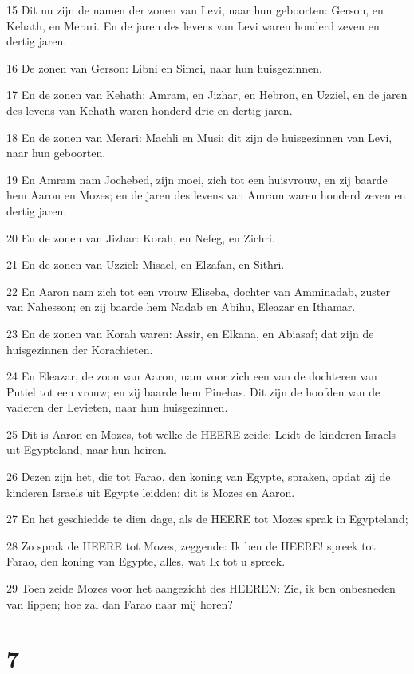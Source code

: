 \par 15 Dit nu zijn de namen der zonen van Levi, naar hun geboorten: Gerson, en Kehath, en Merari. En de jaren des levens van Levi waren honderd zeven en dertig jaren.
\par 16 De zonen van Gerson: Libni en Simei, naar hun huisgezinnen.
\par 17 En de zonen van Kehath: Amram, en Jizhar, en Hebron, en Uzziel, en de jaren des levens van Kehath waren honderd drie en dertig jaren.
\par 18 En de zonen van Merari: Machli en Musi; dit zijn de huisgezinnen van Levi, naar hun geboorten.
\par 19 En Amram nam Jochebed, zijn moei, zich tot een huisvrouw, en zij baarde hem Aaron en Mozes; en de jaren des levens van Amram waren honderd zeven en dertig jaren.
\par 20 En de zonen van Jizhar: Korah, en Nefeg, en Zichri.
\par 21 En de zonen van Uzziel: Misael, en Elzafan, en Sithri.
\par 22 En Aaron nam zich tot een vrouw Eliseba, dochter van Amminadab, zuster van Nahesson; en zij baarde hem Nadab en Abihu, Eleazar en Ithamar.
\par 23 En de zonen van Korah waren: Assir, en Elkana, en Abiasaf; dat zijn de huisgezinnen der Korachieten.
\par 24 En Eleazar, de zoon van Aaron, nam voor zich een van de dochteren van Putiel tot een vrouw; en zij baarde hem Pinehas. Dit zijn de hoofden van de vaderen der Levieten, naar hun huisgezinnen.
\par 25 Dit is Aaron en Mozes, tot welke de HEERE zeide: Leidt de kinderen Israels uit Egypteland, naar hun heiren.
\par 26 Dezen zijn het, die tot Farao, den koning van Egypte, spraken, opdat zij de kinderen Israels uit Egypte leidden; dit is Mozes en Aaron.
\par 27 En het geschiedde te dien dage, als de HEERE tot Mozes sprak in Egypteland;
\par 28 Zo sprak de HEERE tot Mozes, zeggende: Ik ben de HEERE! spreek tot Farao, den koning van Egypte, alles, wat Ik tot u spreek.
\par 29 Toen zeide Mozes voor het aangezicht des HEEREN: Zie, ik ben onbesneden van lippen; hoe zal dan Farao naar mij horen?

\chapter{7}

